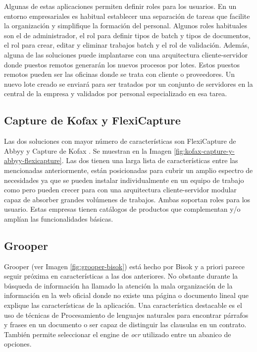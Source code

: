 Algunas de estas aplicaciones permiten definir roles para los usuarios. En un entorno empresariales es habitual establecer una separación de tareas que facilite la organización y simplifique la formación del personal. Algunos roles habituales son el de administrador, el rol para definir tipos de batch y tipos de documentos, el rol para crear, editar y eliminar trabajos batch y el rol de validación. Además, alguna de las soluciones puede implantarse con una arquitectura cliente-servidor donde puestos remotos generarán los nuevos procesos por lotes. Estos puestos remotos pueden ser las oficinas donde se trata con cliente o proveedores. Un nuevo lote creado se enviará para ser tratados por un conjunto de servidores en la central de la empresa y validados por personal especializado en esa tarea.

\subsection{Capture de Kofax y FlexiCapture}

Las dos soluciones con mayor número de características son FlexiCapture de Abbyy \cite{solucionesComerciales_abbyy_flexicapture4invoices} y Capture de Kofax \cite{solucionesComerciales_kofax_capture}. Se muestran en la Imagen \ref{fig:kofax-capture-y-abbyy-flexicapture}. Las dos tienen una larga lista de características entre las mencionadas anteriormente, están posicionadas para cubrir un amplio espectro de necesidades ya que se pueden instalar individualmente en un equipo de trabajo como pero pueden crecer para con una arquitectura cliente-servidor modular capaz de absorber grandes volúmenes de trabajos. Ambas soportan roles para los usuario. Estas empresas tienen catálogos de productos que complementan y/o amplían las funcionalidades básicas.

\subsection{Grooper}

Grooper \cite{solucionesComerciales_bisok_grooper} (ver Imagen \ref{fig:grooper-bisok}) está hecho por Bisok y a priori parece seguir próxima en características a las dos anteriores. No obstante durante la búsqueda de información ha llamado la atención la mala organización de la información en la web oficial donde no existe una página o documento lineal que explique las características de la aplicación. Una característica destacable es el uso de técnicas de Procesamiento de lenguajes naturales para encontrar párrafos y frases en un documento o ser capaz de distinguir las clausulas en un contrato. También permite seleccionar el engine de \emph{\acrlong{ocr}} utilizado entre un abanico de opciones.


